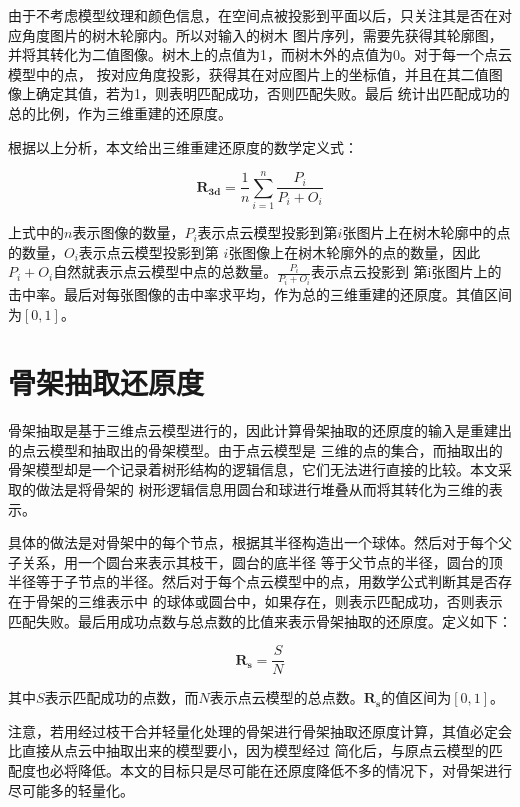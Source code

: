 由于不考虑模型纹理和颜色信息，在空间点被投影到平面以后，只关注其是否在对应角度图片的树木轮廓内。所以对输入的树木
图片序列，需要先获得其轮廓图，并将其转化为二值图像。树木上的点值为1，而树木外的点值为0。对于每一个点云模型中的点，
按对应角度投影，获得其在对应图片上的坐标值，并且在其二值图像上确定其值，若为1，则表明匹配成功，否则匹配失败。最后
统计出匹配成功的总的比例，作为三维重建的还原度。

根据以上分析，本文给出三维重建还原度的数学定义式：\\
\begin{definition}
	\[ \mathbf{R_{3d}}=\frac{1}{n}\sum_{i=1}^n \frac{P_i}{P_i+O_i}\]
\end{definition}

上式中的$n$表示图像的数量，$P_i$表示点云模型投影到第$i$张图片上在树木轮廓中的点的数量，$O_i$表示点云模型投影到第
$i$张图像上在树木轮廓外的点的数量，因此$P_i+O_i$自然就表示点云模型中点的总数量。$\frac{P_i}{P_i+O_i}$表示点云投影到
第i张图片上的击中率。最后对每张图像的击中率求平均，作为总的三维重建的还原度。其值区间为$[0,1]$。

\section{骨架抽取还原度}
骨架抽取是基于三维点云模型进行的，因此计算骨架抽取的还原度的输入是重建出的点云模型和抽取出的骨架模型。由于点云模型是
三维的点的集合，而抽取出的骨架模型却是一个记录着树形结构的逻辑信息，它们无法进行直接的比较。本文采取的做法是将骨架的
树形逻辑信息用圆台和球进行堆叠从而将其转化为三维的表示。

具体的做法是对骨架中的每个节点，根据其半径构造出一个球体。然后对于每个父子关系，用一个圆台来表示其枝干，圆台的底半径
等于父节点的半径，圆台的顶半径等于子节点的半径。然后对于每个点云模型中的点，用数学公式判断其是否存在于骨架的三维表示中
的球体或圆台中，如果存在，则表示匹配成功，否则表示匹配失败。最后用成功点数与总点数的比值来表示骨架抽取的还原度。定义如下：\\
\begin{definition}
	\[ \mathbf{R_s}=\frac{S}{N} \]
\end{definition}

其中$S$表示匹配成功的点数，而$N$表示点云模型的总点数。$\mathbf{R_s}$的值区间为$[0,1]$。

注意，若用经过枝干合并轻量化处理的骨架进行骨架抽取还原度计算，其值必定会比直接从点云中抽取出来的模型要小，因为模型经过
简化后，与原点云模型的匹配度也必将降低。本文的目标只是尽可能在还原度降低不多的情况下，对骨架进行尽可能多的轻量化。

